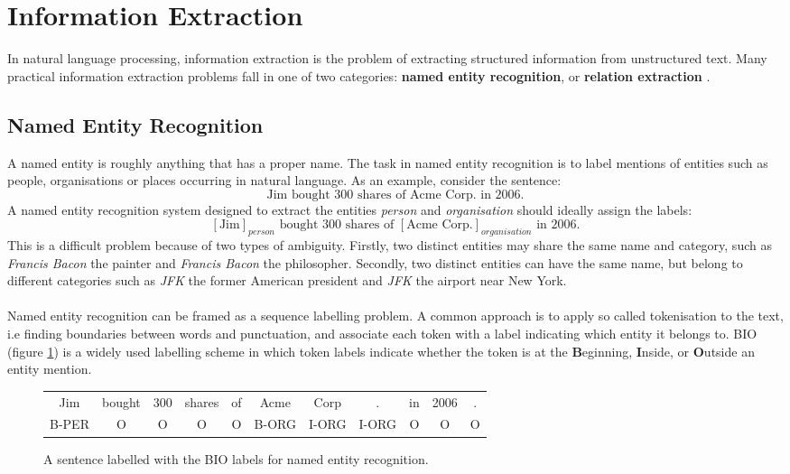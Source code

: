 \section{Information Extraction}
\label{information_extraction}
In natural language processing, information extraction is the problem of extracting structured information from unstructured text. Many practical information extraction problems fall in one of two categories: \textbf{named entity recognition}, or \textbf{relation extraction} \citep{jurafsky09}.

\subsection{Named Entity Recognition}
\label{named_entity_recognition}
A named entity is roughly anything that has a proper name. The task in named entity recognition is to label mentions of entities such as people, organisations or places occurring in natural language. As an example, consider the sentence: 
$$
\text{Jim bought 300 shares of Acme Corp. in 2006.}
$$ 
A named entity recognition system designed to extract the entities \textit{person} and \textit{organisation} should ideally assign the labels:
$$
	[\text{Jim}]_{person} \text{ bought 300 shares of } [\text{Acme Corp.}]_{organisation} \text{ in 2006.}
$$
This is a difficult problem because of two types of ambiguity. Firstly, two distinct entities may share the same name and category, such as \textit{Francis Bacon} the painter and \textit{Francis Bacon} the philosopher. Secondly, two distinct entities can have the same name, but belong to different categories such as \textit{JFK} the former American president and \textit{JFK} the airport near New York.
\\\\
Named entity recognition can be framed as a sequence labelling problem. A common approach is to apply so called tokenisation to the text, i.e finding boundaries between words and punctuation, and associate each token with a label indicating which entity it belongs to. BIO (figure \ref{bio}) is a widely used labelling scheme in which token labels indicate whether the token is at the \textbf{B}eginning, \textbf{I}nside, or \textbf{O}utside an entity mention.
\begin{figure}
	\centering
	\begin{tabular}{c c c c c c c c c c c}
	Jim & bought & 300 & shares & of & Acme & Corp & . & in & 2006 & . \\
	B-PER & O & O & O & O & B-ORG & I-ORG & I-ORG & O & O & O
	\end{tabular}
	\caption{A sentence labelled with the BIO labels for named entity recognition.}
	\label{bio}
\end{figure}

